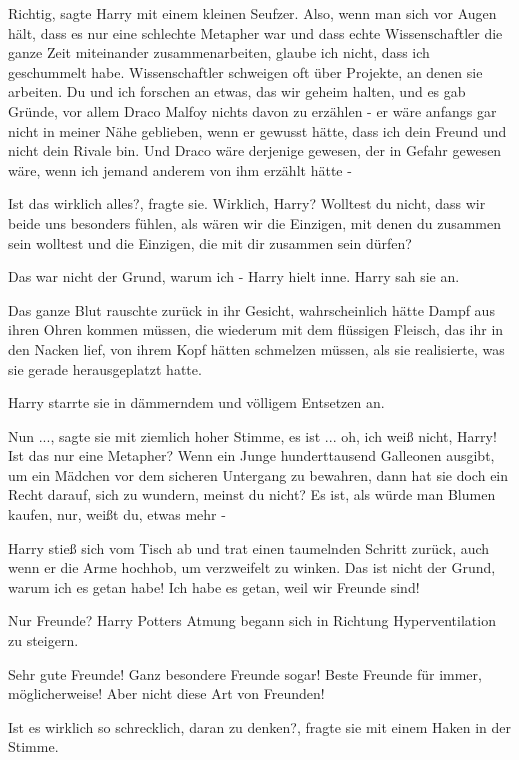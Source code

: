 \glqq Richtig\grqq{}, sagte Harry mit einem kleinen Seufzer. \glqq Also, wenn
man sich vor Augen hält, dass es nur eine schlechte Metapher war und dass echte
Wissenschaftler die ganze Zeit miteinander zusammenarbeiten, glaube ich nicht,
dass ich geschummelt habe. Wissenschaftler schweigen oft über Projekte, an denen
sie arbeiten. Du und ich forschen an etwas, das wir geheim halten, und es gab
Gründe, vor allem Draco Malfoy nichts davon zu erzählen - er wäre anfangs gar
nicht in meiner Nähe geblieben, wenn er gewusst hätte, dass ich dein Freund und
nicht dein Rivale bin. Und Draco wäre derjenige gewesen, der in Gefahr gewesen
wäre, wenn ich jemand anderem von ihm erzählt hätte -\grqq{}

\glqq Ist das wirklich alles?\grqq{}, fragte sie. \glqq Wirklich, Harry?
Wolltest du nicht, dass wir beide uns besonders fühlen, als wären wir die
Einzigen, mit denen du zusammen sein wolltest und die Einzigen, die mit dir
zusammen sein dürfen?\grqq{}

\glqq Das war nicht der Grund, warum ich -\grqq{} Harry hielt inne. Harry sah
sie an.

Das ganze Blut rauschte zurück in ihr Gesicht, wahrscheinlich hätte Dampf aus
ihren Ohren kommen müssen, die wiederum mit dem flüssigen Fleisch, das ihr in
den Nacken lief, von ihrem Kopf hätten schmelzen müssen, als sie realisierte,
was sie gerade herausgeplatzt hatte.

Harry starrte sie in dämmerndem und völligem Entsetzen an.

\glqq Nun ...\grqq{}, sagte sie mit ziemlich hoher Stimme, \glqq es ist ... oh,
ich weiß nicht, Harry! Ist das nur eine Metapher? Wenn ein Junge hunderttausend
Galleonen ausgibt, um ein Mädchen vor dem sicheren Untergang zu bewahren, dann
hat sie doch ein Recht darauf, sich zu wundern, meinst du nicht? Es ist, als
würde man Blumen kaufen, nur, weißt du, etwas mehr -\grqq{}

Harry stieß sich vom Tisch ab und trat einen taumelnden Schritt zurück, auch
wenn er die Arme hochhob, um verzweifelt zu winken. \glqq Das ist nicht der
Grund, warum ich es getan habe! Ich habe es getan, weil wir Freunde sind!\grqq{}

\glqq Nur Freunde?\grqq{} Harry Potters Atmung begann sich in Richtung
Hyperventilation zu steigern.

\glqq Sehr gute Freunde! Ganz besondere Freunde sogar! Beste Freunde für immer,
möglicherweise! Aber nicht diese Art von Freunden!\grqq{}

\glqq Ist es wirklich so schrecklich, daran zu denken?\grqq{}, fragte sie mit
einem Haken in der Stimme.


